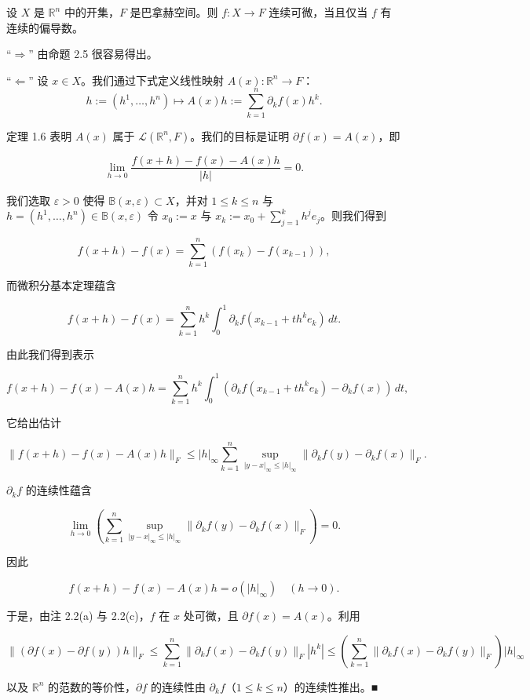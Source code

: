 \begin{theorem}

设 $ X $ 是 $ \mathbb{R}^n $ 中的开集，$ F $ 是巴拿赫空间。则 $ f : X \to F $ 连续可微，当且仅当 $ f $ 有连续的偏导数。

\proofhead
“$ \Rightarrow $” 由命题 2.5 很容易得出。

“$ \Leftarrow $” 设 $ x \in X $。我们通过下式定义线性映射 $ A(x) : \mathbb{R}^n \to F $：
\[
h := (h^1, \ldots, h^n) \mapsto A(x)h := \sum_{k=1}^{n} \partial_k f(x) h^k .
\]

定理 1.6 表明 $ A(x) $ 属于 $ \mathcal{L}(\mathbb{R}^n, F) $。我们的目标是证明 $ \partial f(x) = A(x) $，即

\[
\lim_{h \to 0} \frac{f(x + h) - f(x) - A(x)h}{|h|} = 0 .
\]

我们选取 $ \varepsilon > 0 $ 使得 $ \mathbb{B}(x, \varepsilon) \subset X $，并对 $ 1 \le k \le n $ 与 $ h = (h^1, \ldots, h^n) \in \mathbb{B}(x, \varepsilon) $ 令 $ x_0 := x $ 与 $ x_k := x_0 + \sum_{j=1}^{k} h^j e_j $。则我们得到

\[
f(x + h) - f(x) = \sum_{k=1}^{n} (f(x_k) - f(x_{k-1})) ,
\]

而微积分基本定理蕴含

\[
f(x + h) - f(x) = \sum_{k=1}^{n} h^k \int_0^1 \partial_k f(x_{k-1} + th^k e_k) \, dt .
\]

由此我们得到表示

\[
f(x + h) - f(x) - A(x)h = \sum_{k=1}^{n} h^k \int_0^1 (\partial_k f(x_{k-1} + th^k e_k) - \partial_k f(x)) \, dt ,
\]

它给出估计

\[
\|f(x + h) - f(x) - A(x)h\|_F \le |h|_\infty \sum_{k=1}^{n} \sup_{|y - x|_\infty \le |h|_\infty} \|\partial_k f(y) - \partial_k f(x)\|_F .
\]

$ \partial_k f $ 的连续性蕴含

\[
\lim_{h \to 0} \left( \sum_{k=1}^{n} \sup_{|y - x|_\infty \le |h|_\infty} \|\partial_k f(y) - \partial_k f(x)\|_F \right) = 0 .
\]

因此

\[
f(x + h) - f(x) - A(x)h = o(|h|_\infty) \quad (h \to 0) .
\]

于是，由注 2.2(a) 与 2.2(c)，$ f $ 在 $ x $ 处可微，且 $ \partial f(x) = A(x) $。利用

\[
\|(\partial f(x) - \partial f(y))h\|_F \le \sum_{k=1}^{n} \|\partial_k f(x) - \partial_k f(y)\|_F |h^k| \le \left( \sum_{k=1}^{n} \|\partial_k f(x) - \partial_k f(y)\|_F \right) |h|_\infty
\]

以及 $ \mathbb{R}^n $ 的范数的等价性，$ \partial f $ 的连续性由 $ \partial_k f $（$ 1 \le k \le n $）的连续性推出。\nobreak\hspace{0.35em}■

\end{theorem}

